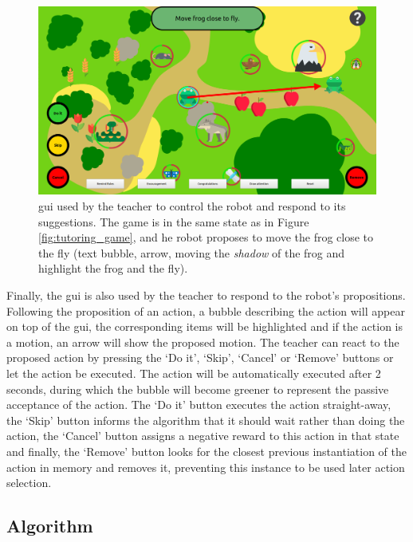 \begin{figure}[ht]
	\centering
	\includegraphics[width=1\textwidth]{gui.png}
	\captionsetup{width=.9\linewidth}
	\caption{\gls{gui} used by the teacher to control the robot and respond to its suggestions. The game is in the same state as in Figure \ref{fig:tutoring_game}, and he robot proposes to move the frog close to the fly (text bubble, arrow, moving the \textit{shadow} of the frog and highlight the frog and the fly).}
	\label{fig:tutoring_gui}
\end{figure}


Finally, the \gls{gui} is also used by the teacher to respond to the robot's propositions. Following the proposition of an action, a bubble describing the action will appear on top of the \gls{gui}, the corresponding items will be highlighted and if the action is a motion, an arrow will show the proposed motion. The teacher can react to the proposed action by pressing the `Do it', `Skip', `Cancel' or `Remove' buttons or let the action be executed. The action will be automatically executed after 2 seconds, during which the bubble will become greener to represent the passive acceptance of the action. The `Do it' button executes the action straight-away, the `Skip' button informs the algorithm that it should wait rather than doing the action, the `Cancel' button assigns a negative reward to this action in that state and finally, the `Remove' button looks for the closest previous instantiation of the action in memory and removes it, preventing this instance to be used later action selection.

\subsection{Algorithm}

